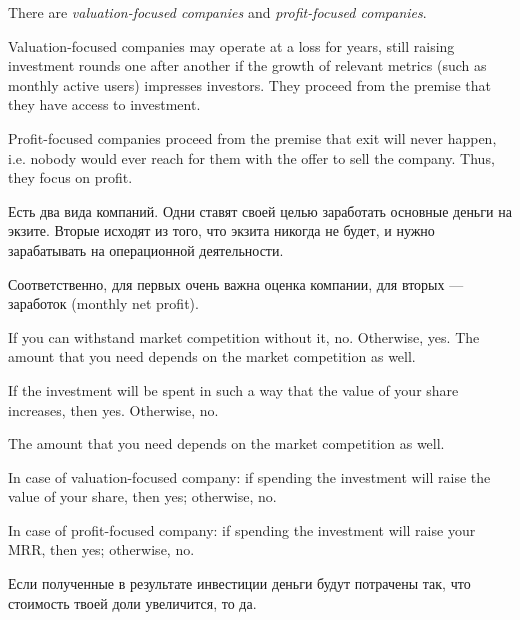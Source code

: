 \documentclass[11pt]{article}
\theoremstyle{remark}
\theoremstyle{definition}
\begin{document}





There are \textit{valuation-focused companies} and \textit{profit-focused companies}. 



Valuation-focused companies may operate at a loss for years, still raising investment rounds one after another if the growth of relevant metrics (such as monthly active users) impresses investors. They proceed from the premise that they have access to investment.

Profit-focused companies proceed from the premise that exit will never happen, i.e. nobody would ever reach for them with the offer to sell the company. Thus, they focus on profit.


Есть два вида компаний. Одни ставят своей целью заработать основные деньги на экзите. Вторые исходят из того, что экзита никогда не будет, и нужно зарабатывать на операционной деятельности.

Соответственно, для первых очень важна оценка компании, для вторых --- заработок (monthly net profit).



If you can withstand market competition without it, no. Otherwise, yes. The amount that you need depends on the market competition as well.




If the investment will be spent in such a way that the value of your share increases, then yes. Otherwise, no. 




The amount that you need depends on the market competition as well.

In case of valuation-focused company: if spending the investment will raise the value of your share, then yes; otherwise, no.

In case of profit-focused company: if spending the investment will raise your MRR, then yes; otherwise, no.

Если полученные в результате инвестиции деньги будут потрачены так, что стоимость твоей доли увеличится, то да.
\end{document}
